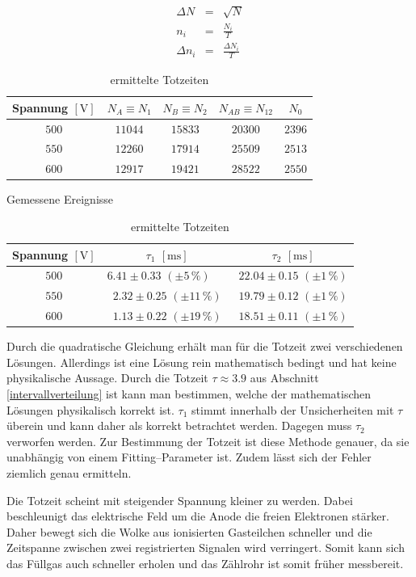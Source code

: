 \documentclass[12pt,a4paper]{scrartcl}
\numberwithin{equation}{section} %
\begin{document}
\begin{eqnarray}
	\Delta N &=& \sqrt{N} \\
	n_i &=& \frac{N_i}{T} \\
	\Delta n_i &=& \frac{\Delta N_i}{T}
\end{eqnarray}

\begin{table}[h!]
	\centering
	\begin{tabular}[h]{c|c|c|c|c}
		Spannung $[\mathrm V]$
			& $N_A\equiv N_1$
			& $N_B\equiv N_2$
			& $N_{AB}\equiv N_{12}$
			& $N_0$ \\
		\hline
		$500$ & $11044$ & $15833$ & $20300$ & $2396$ \\
		$550$ & $12260$ & $17914$ & $25509$ & $2513$ \\
		$600$ & $12917$ & $19421$ & $28522$ & $2550$ \\
	\end{tabular}
	\caption{Gemessene Ereignisse}
	\label{tab:Totzeit Ereignisse}
	\vspace{12pt}

	\begin{tabular}[h]{c|c|c}
		Spannung $[\mathrm V]$
		& $\tau_1$ $[\mathrm{ms}]$
		& $\tau_2$ $[\mathrm{ms}]$ \\
		\hline
		$500$ & $6.41 \pm 0.33$ $(\pm 5 \,\%)$\ \ \  & $22.04 \pm 0.15$ $(\pm 1 \,\%)$ \\
		$550$ & $2.32 \pm 0.25$ $(\pm 11 \,\%)$ & $19.79 \pm 0.12$ $(\pm 1 \,\%)$ \\
		$600$ & $1.13 \pm 0.22$ $(\pm 19 \,\%)$ & $18.51 \pm 0.11$ $(\pm 1 \,\%)$ \\
	\end{tabular}
	\caption{ermittelte Totzeiten}
	\label{tab:Totzeiten}
\end{table}

\noindent
Durch die quadratische Gleichung erhält man für die Totzeit zwei verschiedenen Lösungen. Allerdings ist eine Lösung rein mathematisch bedingt und hat keine physikalische Aussage. Durch die Totzeit $\tau\approx 3.9$ aus Abschnitt \ref{intervallverteilung} ist kann man bestimmen, welche der mathematischen Lösungen physikalisch korrekt ist. $\tau _1$ stimmt innerhalb der Unsicherheiten mit $\tau$ überein und kann daher als korrekt betrachtet werden. Dagegen muss $\tau _2$ verworfen werden. Zur Bestimmung der Totzeit ist diese Methode genauer, da sie unabhängig von einem Fitting--Parameter ist. Zudem lässt sich der Fehler ziemlich genau ermitteln.

Die Totzeit scheint mit steigender Spannung kleiner zu werden. Dabei beschleunigt das elektrische Feld um die Anode die freien Elektronen stärker. Daher bewegt sich die Wolke aus ionisierten Gasteilchen schneller und die Zeitspanne zwischen zwei registrierten Signalen wird verringert. Somit kann sich das Füllgas auch schneller erholen und das Zählrohr ist somit früher messbereit.
\end{document}
